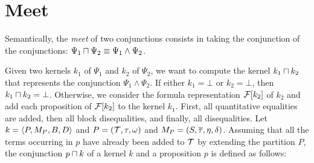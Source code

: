 \section{Meet}\label{section:meet}

Semantically, the \emph{meet} of two conjunctions consists in taking the conjunction of the conjunctions:
$\Psi_1 \sqcap \Psi_2 \equiv \Psi_1 \land \Psi_2$.

Given two kernels $k_1$ of $\Psi_1$ and $k_2$ of $\Psi_2$,
we want to compute the kernel $k_1 \sqcap k_2$ that represents the conjunction $\Psi_1 \land \Psi_2$.
If either $k_1 = \bot$ or $k_2 = \bot$, then $k_1 \sqcap k_2 = \bot$.
Otherwise, we consider the formula representation $\mathcal{F}[k_2]$ of $k_2$ and add each proposition of $\mathcal{F}[k_2]$ to the kernel $k_1$.
First, all quantitative equalities are added, then all block disequalities, and finally, all disequalities.
Let $k = \langle P,M_P,B,D\rangle$ and $P = (\mathcal{T}, \tau, \omega)$ and $M_P = (S, \overline{\tau}, \eta, \delta)$.
Assuming that all the terms occurring in $p$ have already been added to $\mathcal{T}$ by extending the partition $P$,
the conjunction $p \sqcap k$ of a kernel $k$ and a proposition $p$ is defined as follows:
